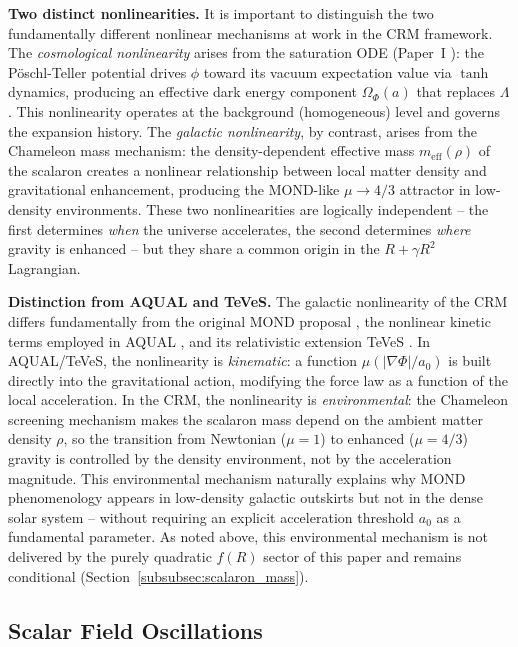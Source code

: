\documentclass[aps,prd,twocolumn,superscriptaddress,nofootinbib]{revtex4-2}
\begin{document}
\textbf{Two distinct nonlinearities.} It is important to distinguish the two fundamentally different nonlinear mechanisms at work in the CRM framework. The \textit{cosmological nonlinearity} arises from the saturation ODE (Paper~I \cite{Geiger2026}): the P\"oschl-Teller potential drives $\phi$ toward its vacuum expectation value via $\tanh$ dynamics, producing an effective dark energy component $\Omega_\Phi(a)$ that replaces $\Lambda$. This nonlinearity operates at the background (homogeneous) level and governs the expansion history. The \textit{galactic nonlinearity}, by contrast, arises from the Chameleon mass mechanism: the density-dependent effective mass $m_{\mathrm{eff}}(\rho)$ of the scalaron creates a nonlinear relationship between local matter density and gravitational enhancement, producing the MOND-like $\mu \to 4/3$ attractor in low-density environments. These two nonlinearities are logically independent -- the first determines \textit{when} the universe accelerates, the second determines \textit{where} gravity is enhanced -- but they share a common origin in the $R + \gamma R^2$ Lagrangian.

\textbf{Distinction from AQUAL and TeVeS.} The galactic nonlinearity of the CRM differs fundamentally from the original MOND proposal \cite{Milgrom1983}, the nonlinear kinetic terms employed in AQUAL \cite{BekensteinMilgrom1984}, and its relativistic extension TeVeS \cite{Bekenstein2004}. In AQUAL/TeVeS, the nonlinearity is \textit{kinematic}: a function $\mu(|\nabla\Phi|/a_0)$ is built directly into the gravitational action, modifying the force law as a function of the local acceleration. In the CRM, the nonlinearity is \textit{environmental}: the Chameleon screening mechanism makes the scalaron mass depend on the ambient matter density $\rho$, so the transition from Newtonian ($\mu = 1$) to enhanced ($\mu = 4/3$) gravity is controlled by the density environment, not by the acceleration magnitude. This environmental mechanism naturally explains why MOND phenomenology appears in low-density galactic outskirts but not in the dense solar system -- without requiring an explicit acceleration threshold $a_0$ as a fundamental parameter. As noted above, this environmental mechanism is not delivered by the purely quadratic $f(R)$ sector of this paper and remains conditional (Section~\ref{subsubsec:scalaron_mass}).

\subsection{Scalar Field Oscillations}
\end{document}
